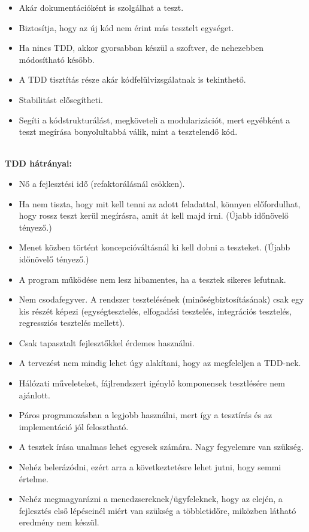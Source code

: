 \begin{itemize}
\item Akár dokumentációként is szolgálhat a teszt.
\item Biztosítja, hogy az új kód nem érint más tesztelt egységet.
\item Ha nincs TDD, akkor gyorsabban készül a szoftver, de nehezebben módosítható később.
\item A TDD tisztítás része akár kódfelülvizsgálatnak is tekinthető.
\item Stabilitást elősegítheti.
\item Segíti a kódstrukturálást, megköveteli a modularizációt, mert egyébként a teszt megírása bonyolultabbá válik, mint a tesztelendő kód.
\end{itemize}
\hfill\\
\textbf{TDD hátrányai:}

\begin{itemize}
\item Nő a fejlesztési idő (refaktorálásnál csökken).
\item Ha nem tiszta, hogy mit kell tenni az adott feladattal, könnyen előfordulhat, hogy rossz teszt kerül megírásra, amit át kell majd írni. (Újabb időnövelő tényező.)
\item Menet közben történt koncepcióváltásnál ki kell dobni a teszteket. (Újabb időnövelő tényező.)
\item A program működése nem lesz hibamentes, ha a tesztek sikeres lefutnak.
\item Nem csodafegyver. A rendszer tesztelésének (minőségbiztosításának) csak egy kis részét képezi (egységtesztelés, elfogadási tesztelés, integrációs tesztelés, regressziós tesztelés mellett).
\item Csak tapasztalt fejlesztőkkel érdemes használni.
\item A tervezést nem mindig lehet úgy alakítani, hogy az megfeleljen a TDD-nek.
\item Hálózati műveleteket, fájlrendszert igénylő komponensek tesztlésére nem ajánlott.
\item Páros programozásban a legjobb használni, mert így a tesztírás és az implementáció jól felosztható.
\item A tesztek írása unalmas lehet egyesek számára. Nagy fegyelemre van szükség.
\item Nehéz belerázódni, ezért arra a következtetésre lehet jutni, hogy semmi értelme.
\item Nehéz megmagyarázni a menedzsereknek/ügyfeleknek, hogy az elején, a fejlesztés első lépéseinél miért van szükség a többletidőre, miközben látható eredmény nem készül.
\end{itemize}

